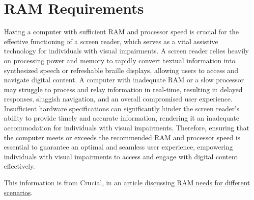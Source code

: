 \documentclass[14pt,letterpaper,twoside]{extreport}
\begin{document}
\pagebreak \hypertarget{ram-requirements}{%
\section{RAM Requirements}\label{ram-requirements}}
Having a computer with sufficient RAM and processor speed is crucial for the effective functioning of a screen reader, which serves as a vital assistive technology for individuals with visual impairments. A screen reader relies heavily on processing power and memory to rapidly convert textual information into synthesized speech or refreshable braille displays, allowing users to access and navigate digital content. A computer with inadequate RAM or a slow processor may struggle to process and relay information in real-time, resulting in delayed responses, sluggish navigation, and an overall compromised user experience. Insufficient hardware specifications can significantly hinder the screen reader's ability to provide timely and accurate information, rendering it an inadequate accommodation for individuals with visual impairments. Therefore, ensuring that the computer meets or exceeds the recommended RAM and processor speed is essential to guarantee an optimal and seamless user experience, empowering individuals with visual impairments to access and engage with digital content effectively.

This information is from Crucial, in an \href{https://www.crucial.com/articles/about-memory/how-much-ram-does-my-computer-need}{article discussing RAM needs for different scenarios}.
\end{document}
